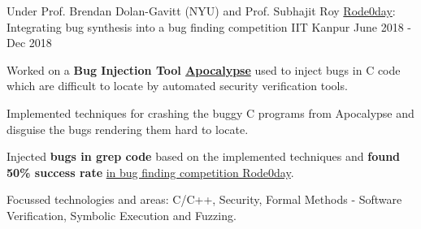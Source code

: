 \begin{cventries}





  \cventry
    {Under Prof. Brendan Dolan-Gavitt (NYU) and Prof. Subhajit Roy} %
    {\href{https://rode0day.mit.edu/}{Rode0day}: Integrating bug synthesis into a bug finding competition} %
    {IIT Kanpur} %
    {June 2018 - Dec 2018} %
    {
      \begin{cvitems} %
        \item {Worked on a \textbf{Bug Injection Tool \href{https://dl.acm.org/doi/abs/10.1145/3236024.3236084}{Apocalypse}} used to inject bugs in C code which are difficult to locate by automated security verification tools.}
        \item {Implemented techniques for crashing the buggy C programs from Apocalypse and disguise the bugs rendering them hard to locate.}
        \item {Injected \textbf{bugs in grep code} based on the implemented techniques and \textbf{found 50\% success rate} \href{https://rode0day.mit.edu/results/4}{in bug finding competition Rode0day}.}
        \item {Focussed technologies and areas: C/C++, Security, Formal Methods - Software Verification, Symbolic Execution and Fuzzing.}
      \end{cvitems}
    }


\end{cventries}
